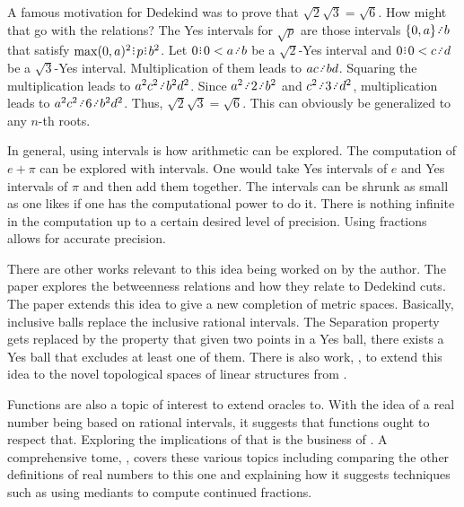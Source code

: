 \documentclass[12pt]{article}
\begin{document}
A famous motivation for Dedekind was to prove that $\sqrt{2} \sqrt{3} = \sqrt{6}$. How might that go with the relations? The Yes intervals for $\sqrt{p}$ are those intervals $\{0, a\} \lte b$ that satisfy $\max(0,a)^2 \rint  p \rint  b^2$. Let $0\rint 0 < a \lte b$ be a $\sqrt{2}$-Yes interval and $0\rint 0 < c\lte d$ be a $\sqrt{3}$-Yes interval. Multiplication of them leads to $ac \lte bd$. Squaring the multiplication leads to $a^2 c^2 \lte b^2 d^2$. Since $a^2 \lte 2 \lte b^2$ and $c^2 \lte 3 \lte d^2$, multiplication leads to $a^2 c^2 \lte 6 \lte b^2 d^2$. Thus, $\sqrt{2} \sqrt{3} = \sqrt{6}$. This can obviously be generalized to any $n$-th roots. 

In general, using intervals is how arithmetic can be explored. The computation of $e + \pi$ can be explored with intervals. One would take Yes intervals of $e$ and Yes intervals of $\pi$ and then add them together. The intervals can be shrunk as small as one likes if one has the computational power to do it. There is nothing infinite in the computation up to a certain desired level of precision. Using fractions allows for accurate precision. 

There are other works relevant to this idea being worked on by the author. The paper \cite{taylor24dedekind} explores the betweenness relations and how they relate to Dedekind cuts. The paper \cite{taylor23metric} extends this idea to give a new completion of metric spaces. Basically, inclusive balls replace the inclusive rational intervals. The Separation property gets replaced by the property that given two points in a Yes ball, there exists a Yes ball that excludes at least one of them. There is also work, \cite{taylor23maudlin}, to extend this idea to the novel topological spaces of linear structures from \cite{maudlin}. 

Functions are also a topic of interest to extend oracles to. With the idea of a real number being based on rational intervals, it suggests that functions ought to respect that. Exploring the implications of that is the business of \cite{taylor23funora}. A comprehensive tome, \cite{taylor23main}, covers these various topics including comparing the other definitions of real numbers to this one and explaining how it suggests techniques such as using mediants to compute continued fractions. 

\medskip

\normalem %


\printbibliography
\end{document}
